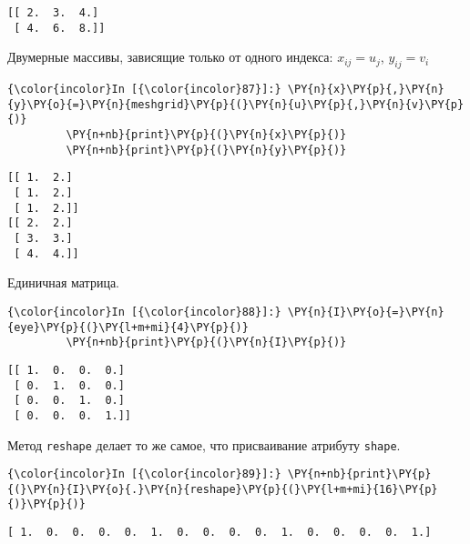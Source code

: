     \begin{Verbatim}[commandchars=\\\{\}]
[[ 2.  3.  4.]
 [ 4.  6.  8.]]

    \end{Verbatim}

    Двумерные массивы, зависящие только от одного индекса: \(x_{ij}=u_j\),
\(y_{ij}=v_i\)

    \begin{Verbatim}[commandchars=\\\{\}]
{\color{incolor}In [{\color{incolor}87}]:} \PY{n}{x}\PY{p}{,}\PY{n}{y}\PY{o}{=}\PY{n}{meshgrid}\PY{p}{(}\PY{n}{u}\PY{p}{,}\PY{n}{v}\PY{p}{)}
         \PY{n+nb}{print}\PY{p}{(}\PY{n}{x}\PY{p}{)}
         \PY{n+nb}{print}\PY{p}{(}\PY{n}{y}\PY{p}{)}
\end{Verbatim}

    \begin{Verbatim}[commandchars=\\\{\}]
[[ 1.  2.]
 [ 1.  2.]
 [ 1.  2.]]
[[ 2.  2.]
 [ 3.  3.]
 [ 4.  4.]]

    \end{Verbatim}

    Единичная матрица.

    \begin{Verbatim}[commandchars=\\\{\}]
{\color{incolor}In [{\color{incolor}88}]:} \PY{n}{I}\PY{o}{=}\PY{n}{eye}\PY{p}{(}\PY{l+m+mi}{4}\PY{p}{)}
         \PY{n+nb}{print}\PY{p}{(}\PY{n}{I}\PY{p}{)}
\end{Verbatim}

    \begin{Verbatim}[commandchars=\\\{\}]
[[ 1.  0.  0.  0.]
 [ 0.  1.  0.  0.]
 [ 0.  0.  1.  0.]
 [ 0.  0.  0.  1.]]

    \end{Verbatim}

    Метод \texttt{reshape} делает то же самое, что присваивание атрибуту
\texttt{shape}.

    \begin{Verbatim}[commandchars=\\\{\}]
{\color{incolor}In [{\color{incolor}89}]:} \PY{n+nb}{print}\PY{p}{(}\PY{n}{I}\PY{o}{.}\PY{n}{reshape}\PY{p}{(}\PY{l+m+mi}{16}\PY{p}{)}\PY{p}{)}
\end{Verbatim}

    \begin{Verbatim}[commandchars=\\\{\}]
[ 1.  0.  0.  0.  0.  1.  0.  0.  0.  0.  1.  0.  0.  0.  0.  1.]

    \end{Verbatim}

